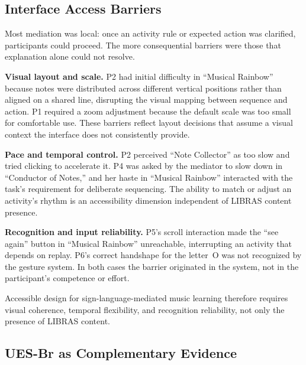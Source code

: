 \documentclass{llncs}
\begin{document}
\subsection{Interface Access Barriers}

Most mediation was local: once an activity rule or expected action was clarified,
participants could proceed. The more consequential barriers were those that explanation
alone could not resolve.

\textbf{Visual layout and scale.} P2 had initial difficulty in ``Musical Rainbow''
because notes were distributed across different vertical positions rather than aligned on
a shared line, disrupting the visual mapping between sequence and action. P1 required a
zoom adjustment because the default scale was too small for comfortable use. These
barriers reflect layout decisions that assume a visual context the interface does not
consistently provide.

\textbf{Pace and temporal control.} P2 perceived ``Note Collector'' as too slow and
tried clicking to accelerate it. P4 was asked by the mediator to slow down in
``Conductor of Notes,'' and her haste in ``Musical Rainbow'' interacted with the task's
requirement for deliberate sequencing. The ability to match or adjust an activity's rhythm is an accessibility dimension independent of LIBRAS content presence.

\textbf{Recognition and input reliability.} P5's scroll interaction made the ``see
again'' button in ``Musical Rainbow'' unreachable, interrupting an activity that depends
on replay. P6's correct handshape for the letter~O was not recognized by the gesture
system. In both cases the barrier originated in the system, not in the participant's
competence or effort.

Accessible design for sign-language-mediated music learning therefore requires visual coherence, temporal flexibility, and recognition reliability, not only the presence of LIBRAS content.

\subsection{UES-Br as Complementary Evidence}
\end{document}
